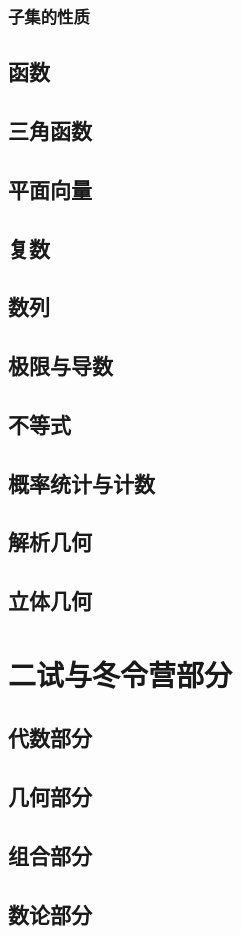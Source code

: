 \documentclass[lang=cn, zihao=4.5]{elegantbook}
\begin{document}
\newpage
\section{子集的性质}



\chapter{函数}

\chapter{三角函数}

\chapter{平面向量}

\chapter{复数}

\chapter{数列}

\chapter{极限与导数}

\chapter{不等式}

\chapter{概率统计与计数}

\chapter{解析几何}

\chapter{立体几何}








\part{二试与冬令营部分}

\chapter{代数部分}

\chapter{几何部分}

\chapter{组合部分}

\chapter{数论部分}
\end{document}
